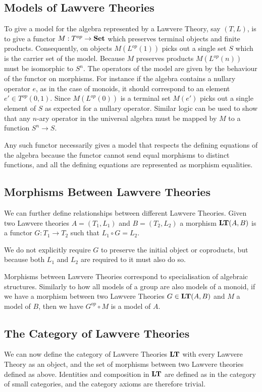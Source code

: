 \subsection{Models of Lawvere Theories}
To give a model for the algebra represented by a Lawvere Theory, say $(T, L)$,
is to give a functor $M: T^{op}\to \mathbf{Set}$ which preserves terminal
objects and finite products. Consequently, on objects $M(L^{op}(1))$ picks out a
single set $S$ which is the carrier set of the model. Because $M$ preserves
products $M(L^{op}(n))$ must be isomorphic to $S^n$. The operators of the model
are given by the behaviour of the functor on morphisms. For instance if the
algebra contains a nullary operator $e$, as in the case of monoids, it should
correspond to an element $e'\in T^{op}(0,1)$. Since $M(L^{op}(0))$ is a terminal
set $M(e')$ picks out a single element of $S$ as expected for a nullary
operator. Similar logic can be used to show that any $n$-ary operator in the
universal algebra must be mapped by $M$ to a function $S^n\to S$.

Any such functor necessarily gives a model that respects the defining equations
of the algebra because the functor cannot send equal morphisms to distinct
functions, and all the defining equations are represented as morphism
equalities.

\subsection{Morphisms Between Lawvere Theories}
We can further define relationships between different Lawvere Theories. Given
two Lawvere theories $A = (T_1, L_1)$ and $B = (T_2, L_2)$ a morphism
$\mathbf{LT}(A, B)$ is a functor $G: T_1\to T_2$ such that $L_1\circ G = L_2$.

We do not explicitly require $G$ to preserve the initial object or coproducts,
but because both $L_1$ and $L_2$ are required to it must also do so.

Morphisms between Lawvere Theories correspond to specialisation of algebraic
structures. Similarly to how all models of a group are also models of a monoid,
if we have a morphism between two Lawvere Theories $G\in \mathbf{LT}(A, B)$ and
$M$ a model of $B$, then we have $G^{op}\circ M$ is a model of $A$.

\subsection{The Category of Lawvere Theories}
We can now define the category of Lawvere Theories $\mathbf{LT}$ with every
Lawvere Theory as an object, and the set of morphisms between two Lawvere
theories defined as above. Identities and composition in $\mathbf{LT}$ are
defined as in the category of small categories, and the category axioms are
therefore trivial.

